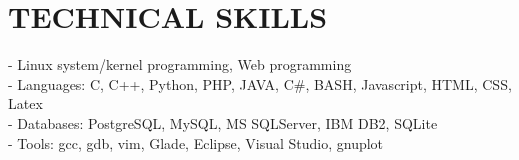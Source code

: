 \section{TECHNICAL SKILLS}
\vspace{0.07in}
- Linux system/kernel programming, Web programming
\vspace{0.04in}\\
- Languages: C, C++, Python, PHP, JAVA, C\#, BASH, Javascript, HTML, CSS, Latex
\vspace{0.04in}\\
- Databases: PostgreSQL, MySQL, MS SQLServer, IBM DB2, SQLite
\vspace{0.04in}\\
- Tools: gcc, gdb, vim, Glade, Eclipse, Visual Studio, gnuplot

